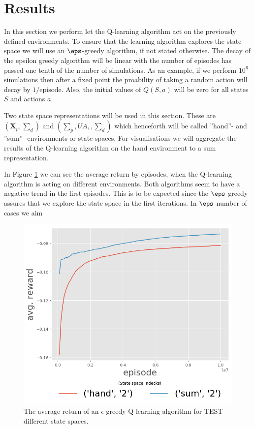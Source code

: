 \section{Results}
In this section we perform let the Q-learning algorithm act on the previously defined environments. To ensure that the learning algorithm explores the state space we will use an $\eps$-greedy algorithm, if not stated otherwise. The decay of the epsilon greedy algorithm will be linear with the number of episodes has passed one tenth of the number of simulations. As an example, if we perform $10^6$ simulations then after a fixed point the proability of taking a random action will decay by $1 / \text{episode}$. Also, the initial values of $Q(S, a)$ will be zero for all states $S$ and actions $a$. 

Two state space representations will be used in this section. These are $(\mathbf{X}_p, \sum_d)$ and $(\sum_p, UA, , \sum_d)$ which henceforth will be called ''hand''- and ''sum''- environments or state spaces. For visualisations we will aggregate the results of the Q-learning algorithm on the hand environment to a sum representation.

In Figure \ref{fig:avg_return} we can see the average return by episodes, when the Q-learning algorithm is acting on different environments. Both algorithms seem to have a negative trend in the first episodes. This is to be expected since the $\eps$ greedy assures that we explore the state space in the first iterations. In $\eps$ number of cases we aim  

\begin{figure}[htp]
 \centering
	 \includegraphics[scale=0.7]{./figures/avgReturnEp_ndeck2.png}
 \caption{The average return of an $\epsilon$-greedy Q-learning algorithm for TEST different state spaces. \label{fig:avg_return}}
\end{figure}



